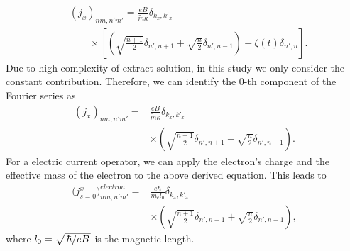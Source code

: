 \documentclass[
 reprint,
 amsmath,amssymb,
 aps,
 prb,
]{revtex4-2}
\begin{document}
{\begin{equation}
  \begin{aligned}
    &\left({j}_x \right)_{nm,n'm'} =
    \frac{eB}{{\widetilde{m}}\kappa}
    \delta_{k_x,k'_x} \\
    & \qquad\times
    \left[
    \left(\sqrt{\frac{n+1}{2}} \delta_{n',n+1} + \sqrt{\frac{n}{2}}
    \delta_{n',n-1}\right)
    + \zeta(t) \delta_{n',n}
    \right].
  \end{aligned}
\end{equation}
Due to high complexity of extract solution, in this study we only consider the constant contribution. Therefore, we can identify the $0$-th component of the Fourier series as
\begin{equation} \label{eq:d11}
  \begin{aligned}
      \left({j}_x \right)_{nm,n'm'} =&
      \frac{eB}{\widetilde{m}\kappa}
      \delta_{k_x,k'_x} \\
      & \times
      \left(\sqrt{\frac{n+1}{2}} \delta_{n',n+1} + \sqrt{\frac{n}{2}}
      \delta_{n',n-1} \right).
  \end{aligned}
\end{equation}
For a electric current operator, we can apply the electron's charge and the  effective mass of the electron to the above derived equation. This leads to
\begin{equation} \label{eq:d12}
  \begin{aligned}
      \Big({j}^x_{s=0}\Big)_{nm,n'm'}^{electron}  =&
      \frac{e\hbar}{{m_e}l_0}
      \delta_{k_x,k'_x}\\
      & \times
      \left(\sqrt{\frac{n+1}{2}} \delta_{n',n+1} + \sqrt{\frac{n}{2}}
      \delta_{n',n-1} \right),
  \end{aligned}
\end{equation}
where $l_0 = \sqrt{\flatfrac{\hbar}{eB}}$ is the magnetic length.

}
\end{document}
